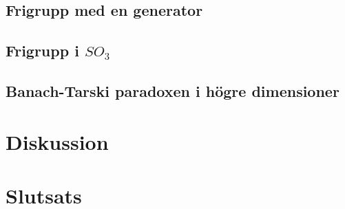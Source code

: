 \documentclass{article}
\theoremstyle{definition}
\begin{document}
\subsection{Frigrupp med en generator}
\subsection{Frigrupp i \texorpdfstring{$SO_3$}{}}
\subsection{Banach-Tarski paradoxen i högre dimensioner}

\section{Diskussion}
\section{Slutsats}
\end{document}
